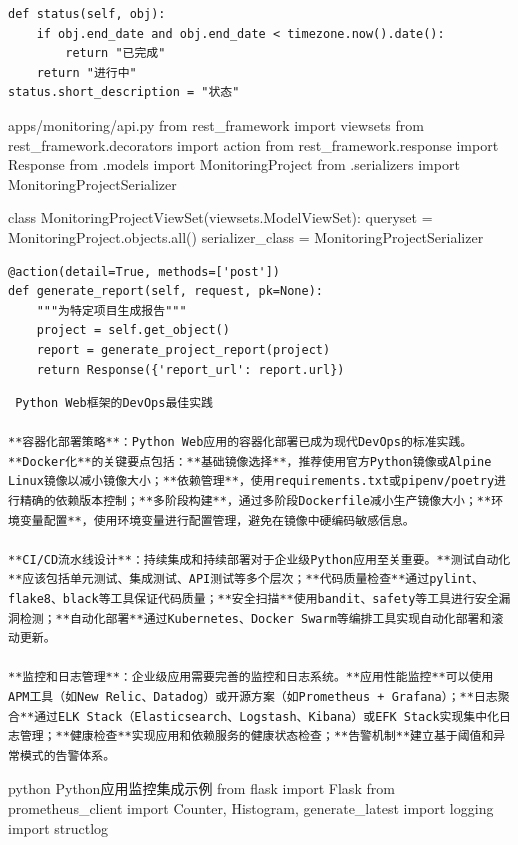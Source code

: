 \begin{verbatim}
def status(self, obj):
    if obj.end_date and obj.end_date < timezone.now().date():
        return "已完成"
    return "进行中"
status.short_description = "状态"
\end{verbatim}

 apps/monitoring/api.py from rest\_framework import viewsets from rest\_framework.decorators import action from rest\_framework.response import Response from .models import MonitoringProject from .serializers import MonitoringProjectSerializer

class MonitoringProjectViewSet(viewsets.ModelViewSet): queryset = MonitoringProject.objects.all() serializer\_class = MonitoringProjectSerializer

\begin{verbatim}
@action(detail=True, methods=['post'])
def generate_report(self, request, pk=None):
    """为特定项目生成报告"""
    project = self.get_object()
    report = generate_project_report(project)
    return Response({'report_url': report.url})
\end{verbatim}

\begin{lstlisting}
 Python Web框架的DevOps最佳实践

**容器化部署策略**：Python Web应用的容器化部署已成为现代DevOps的标准实践。**Docker化**的关键要点包括：**基础镜像选择**，推荐使用官方Python镜像或Alpine Linux镜像以减小镜像大小；**依赖管理**，使用requirements.txt或pipenv/poetry进行精确的依赖版本控制；**多阶段构建**，通过多阶段Dockerfile减小生产镜像大小；**环境变量配置**，使用环境变量进行配置管理，避免在镜像中硬编码敏感信息。

**CI/CD流水线设计**：持续集成和持续部署对于企业级Python应用至关重要。**测试自动化**应该包括单元测试、集成测试、API测试等多个层次；**代码质量检查**通过pylint、flake8、black等工具保证代码质量；**安全扫描**使用bandit、safety等工具进行安全漏洞检测；**自动化部署**通过Kubernetes、Docker Swarm等编排工具实现自动化部署和滚动更新。

**监控和日志管理**：企业级应用需要完善的监控和日志系统。**应用性能监控**可以使用APM工具（如New Relic、Datadog）或开源方案（如Prometheus + Grafana）；**日志聚合**通过ELK Stack（Elasticsearch、Logstash、Kibana）或EFK Stack实现集中化日志管理；**健康检查**实现应用和依赖服务的健康状态检查；**告警机制**建立基于阈值和异常模式的告警体系。
\end{lstlisting}

python  Python应用监控集成示例 from flask import Flask from prometheus\_client import Counter, Histogram, generate\_latest import logging import structlog

